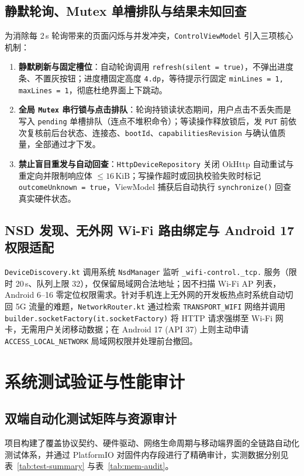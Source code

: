 \documentclass[10.5pt,a4paper]{ctexart}
\newcommand{\code}[1]{{\ttfamily\small\nolinkurl{#1}}}
\begin{document}
\subsection{静默轮询、Mutex 单槽排队与结果未知回查}
为消除每 2\,s 轮询带来的页面闪烁与并发冲突，\code{ControlViewModel} 引入三项核心机制：
\begin{enumerate}
    \item \textbf{静默刷新与固定槽位}：自动轮询调用 \code{refresh(silent = true)}，不弹出进度条、不置灰按钮；进度槽固定高度 \code{4.dp}，等待提示行固定 \code{minLines = 1, maxLines = 1}，彻底杜绝界面上下跳动。
    \item \textbf{全局 \code{Mutex} 串行锁与点击排队}：轮询持锁读状态期间，用户点击不丢失而是写入 \code{pending} 单槽排队（连点不堆积命令）；等读操作释放锁后，发 \code{PUT} 前依次复核前后台状态、连接态、\code{bootId}、\code{capabilitiesRevision} 与确认值质量，全部通过才下发。
    \item \textbf{禁止盲目重发与自动回查}：\code{HttpDeviceRepository} 关闭 OkHttp 自动重试与重定向并限制响应体 $\le 16\,\text{KiB}$；写操作超时或回执校验失败时标记 \code{outcomeUnknown = true}，ViewModel 捕获后自动执行 \code{synchronize()} 回查真实硬件状态。
\end{enumerate}

\subsection{NSD 发现、无外网 Wi-Fi 路由绑定与 Android 17 权限适配}
\code{DeviceDiscovery.kt} 调用系统 \code{NsdManager} 监听 \code{_wifi-control._tcp.} 服务（限时 20\,s、队列上限 32），仅保留局域网合法地址；因不扫描 Wi-Fi AP 列表，Android 6--16 零定位权限需求。针对手机连上无外网的开发板热点时系统自动切回 5G 流量的难题，\code{NetworkRouter.kt} 通过检索 \code{TRANSPORT_WIFI} 网络并调用 \code{builder.socketFactory(it.socketFactory)} 将 HTTP 请求强绑至 Wi-Fi 网卡，无需用户关闭移动数据；在 Android 17 (API 37) 上则主动申请 \code{ACCESS_LOCAL_NETWORK} 局域网权限并处理前台撤回。

\section{系统测试验证与性能审计}

\subsection{双端自动化测试矩阵与资源审计}
项目构建了覆盖协议契约、硬件驱动、网络生命周期与移动端界面的全链路自动化测试体系，并通过 PlatformIO 对固件内存段进行了精确审计，实测数据分别见表~\ref{tab:test-summary} 与表~\ref{tab:mem-audit}。
\end{document}
